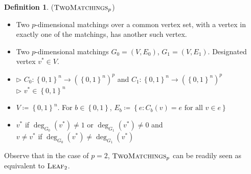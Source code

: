\documentclass[10pt,a4paper]{article}
\theoremstyle{definition}
\newtheorem{definition}[theorem]{Definition}
\theoremstyle{remark}
\newcommand{\contour}[2]{#2}
\def\set#1{\left\{#1\right\}}
\newcommand{\bit}{\ensuremath{\set{0,1}}}
\newcommand{\leaf}{\ensuremath\textsc{Leaf}}
\newcommand{\twoMatchings}{\ensuremath{\textsc{TwoMatchings}}}
\begin{document}
\noindent
\begin{minipage}{\linewidth}
\begin{definition}
	\label{def:two-matchings} \contour{black}{($\twoMatchings_p$)}\vspace{-5pt}
	\begin{itemize}[leftmargin=2.15cm,itemsep=4pt]
		\item[\slshape Principle:] Two $p$-dimensional matchings over a common vertex set, with a vertex in exactly one of the matchings, has another such vertex.
		\item[\slshape Object:] Two $p$-dimensional matchings $G_0 = (V, E_0)$, $G_1 = (V, E_1)$. Designated vertex $v^* \in V$.
		\item[\slshape Inputs:] $\triangleright$ $C_0:\bit^n \to (\bit^n)^p$ and $C_1:\bit^n \to (\bit^n)^p$\\
	$\triangleright$ $v^* \in \bit^n$
		\item[\slshape Encoding:] $V\coloneqq\bit^n$. For $b \in \bit$, $E_b \coloneqq \set{e : C_b(v) = e \text{ for all } v \in e}$	
		\item[\slshape Solutions:] $v^*$ if $\deg_{G_0}(v^*) \ne 1$ or $\deg_{G_1}(v^*) \ne 0$ and\\
	$v \ne v^*$ if $\deg_{G_0}(v^*) \ne \deg_{G_1}(v^*)$
	\end{itemize}
\end{definition}
\end{minipage}\vspace{5mm}


\noindent Observe that in the case of $p=2$, $\twoMatchings_p$ can be readily seen as equivalent to $\leaf_2$.
\end{document}
